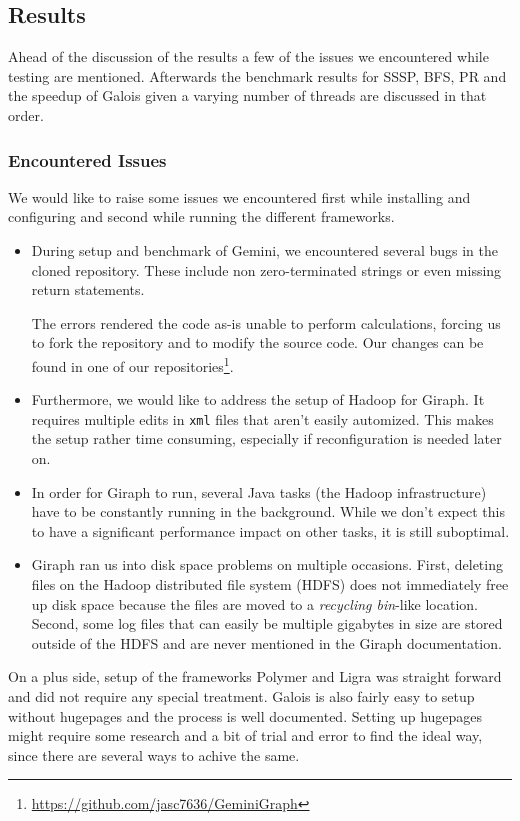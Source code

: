 
\subsection{Results}
Ahead of the discussion of the results a few of the issues we encountered while testing are mentioned. Afterwards the benchmark results for SSSP, BFS, PR and the speedup of Galois given a varying number of threads are discussed in that order.


\subsubsection{Encountered Issues}
We would like to raise some issues we encountered first while installing and configuring and second while running the different frameworks.

\begin{itemize}
	\item During setup and benchmark of Gemini, we encountered several bugs in the cloned repository. These include non zero-terminated strings or even missing return statements.

	The errors rendered the code as-is unable to perform calculations, forcing us to fork the repository and to modify the source code. Our changes can be found in one of our repositories\footnote{\url{https://github.com/jasc7636/GeminiGraph}}.

	\item Furthermore, we would like to address the setup of Hadoop for Giraph. It requires multiple edits in \texttt{xml} files that aren't easily automized. This makes the setup rather time consuming, especially if reconfiguration is needed later on.
	\item In order for Giraph to run, several Java tasks (the Hadoop infrastructure) have to be constantly running in the background. While we don't expect this to have a significant performance impact on other tasks, it is still suboptimal.
	\item Giraph ran us into disk space problems on multiple occasions. First, deleting files on the Hadoop distributed file system (HDFS) does not immediately free up disk space because the files are moved to a \emph{recycling bin}-like location. Second, some log files that can easily be multiple gigabytes in size are stored outside of the HDFS and are never mentioned in the Giraph documentation.
\end{itemize}
\noindent
On a plus side, setup of the frameworks Polymer and Ligra was straight forward and did not require any special treatment.
Galois is also fairly easy to setup without hugepages and the process is well documented. 
Setting up hugepages might require some research and a bit of trial and error to find the ideal way, since there are several ways to achive the same.





